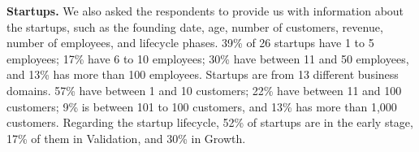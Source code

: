 \documentclass[runningheads]{llncs}
\begin{document}
\textbf{Startups.} We also asked the respondents to provide us with information about the startups, such as the founding date, age, number of customers, revenue, number of employees, and lifecycle phases. 39\% of 26 startups have 1 to 5 employees; 17\% have 6 to 10 employees; 30\% have between 11 and 50 employees, and 13\% has more than 100 employees. Startups are from 13 different business domains. 57\% have between 1 and 10 customers; 22\% have between 11 and 100 customers; 9\% is between 101 to 100 customers, and 13\% has more than 1,000 customers. Regarding the startup lifecycle, 52\% of startups are in the early stage, 17\% of them in Validation, and 30\% in Growth. %
{

}
\end{document}
